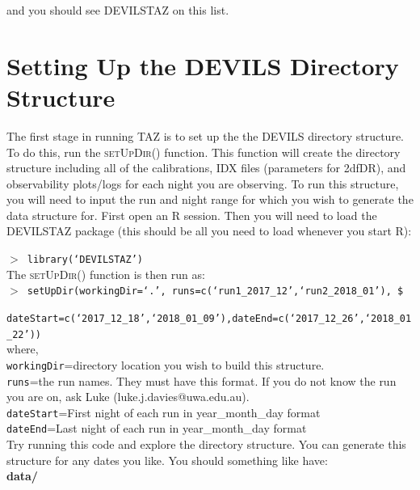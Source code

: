 \documentclass[12pt]{article}
\begin{document}
and you should see DEVILSTAZ on this list.

\section{Setting Up the DEVILS Directory Structure}

The first stage in running \textsc{TAZ} is to set up the the DEVILS directory structure. To do this, run the \textsc{setUpDir()} function. This function will create the directory structure including all of the calibrations, IDX files (parameters for 2dfDR), and observability plots/logs for each night you are observing.  To run this structure, you will need to input the run and night range for which you wish to generate the data structure for. First open an R session. Then you will need to load the \textsc{DEVILSTAZ} package (this should be all you need to load whenever you start R):

\hspace{10mm}  \texttt{$>$ library(`DEVILSTAZ')}\\

The \textsc{setUpDir()}  function is then run as:\\

\hspace{10mm}  \texttt{$>$ setUpDir(workingDir=`.', runs=c(`run1\_2017\_12',`run2\_2018\_01'), \$}

\hspace{20mm}   \texttt{dateStart=c(`2017\_12\_18',`2018\_01\_09'),dateEnd=c(`2017\_12\_26',`2018\_01\_22'))}\\

where, \\

 \texttt{workingDir}=directory location you wish to build this structure.\\
 \texttt{runs}=the run names. They must have this format. If you do not know the run you are on, ask Luke (luke.j.davies@uwa.edu.au).\\
 \texttt{dateStart}=First night of each run in year\_month\_day format\\
 \texttt{dateEnd}=Last night of each run in year\_month\_day format\\

Try running this code and explore the directory structure. You can generate this structure for any dates you like. You should something like have:\\

\hspace{5mm} \textbf{data/} 
\vspace{1mm}
\end{document}
